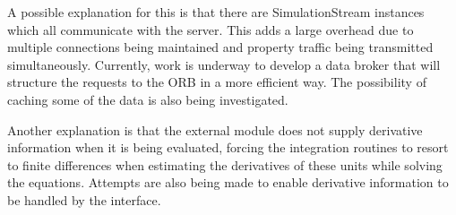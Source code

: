 A possible explanation for this is that there are SimulationStream
instances which all communicate with the server.  This adds a large
overhead due to multiple connections being maintained and property
traffic being transmitted simultaneously.  Currently, work is underway
to develop a data broker that will structure the requests to the ORB
in a more efficient way.  The possibility of caching some of the data
is also being investigated.

Another explanation is that the external module does not supply
derivative information when it is being evaluated, forcing the
integration routines to resort to finite differences when estimating
the derivatives of these units while solving the equations.  Attempts
are also being made to enable derivative information to be handled by
the interface.



